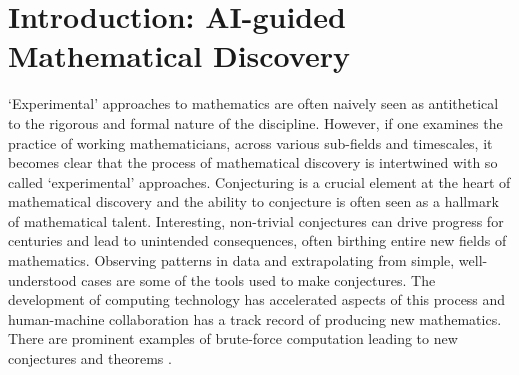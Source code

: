 \chapter{Introduction: AI-guided Mathematical Discovery}
\label{chap:intro}
 
`Experimental' approaches to mathematics are often naively seen as antithetical to the rigorous and formal nature of the discipline. However, if one examines the practice of working mathematicians, across various sub-fields and timescales, it becomes clear that the process of mathematical discovery is intertwined with so called `experimental' approaches.
Conjecturing is a crucial element at the heart of mathematical discovery and the ability to conjecture is often seen as a hallmark of mathematical talent. Interesting, non-trivial conjectures can drive progress for centuries and lead to unintended consequences, often birthing entire new fields of mathematics. Observing patterns in data and extrapolating from simple, well-understood cases are some of the tools used to make conjectures.
The development of computing technology has accelerated aspects of this process and human-machine collaboration has a track record of producing new mathematics. There are prominent examples of brute-force computation leading to new conjectures \cite{BIRCHSwinnertonDyer1965} and theorems \cite{4col_1977,4col_every_1977,MR2463991}.

